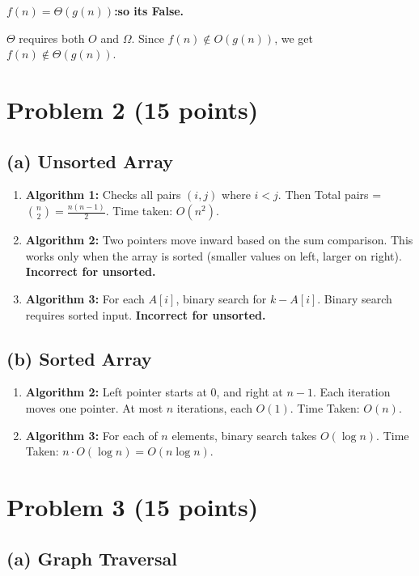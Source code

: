 \documentclass[11pt]{article}
\begin{document}
\textbf{$f(n)=\Theta(g(n))$:so its False.}

\medskip

$\Theta$ requires both $O$ and $\Omega$. Since $f(n) \notin O(g(n))$, we get $f(n) \notin \Theta(g(n))$.

\newpage
\section*{Problem 2 (15 points)}

\subsection*{(a) Unsorted Array}
\begin{enumerate}
    \item \textbf{Algorithm 1:} Checks all pairs $(i,j)$ where $i < j$. Then Total pairs = $\binom{n}{2} = \frac{n(n-1)}{2}$. Time taken: $O(n^2)$.
    \item \textbf{Algorithm 2:} Two pointers move inward based on the sum comparison. This  works only when the array is sorted (smaller values on left, larger on right). \textbf{Incorrect for unsorted.}
    \item \textbf{Algorithm 3:} For each $A[i]$, binary search for $k - A[i]$. Binary search requires sorted input. \textbf{Incorrect for unsorted.}
\end{enumerate}

\subsection*{(b) Sorted Array}
\begin{enumerate}
    \item \textbf{Algorithm 2:} Left pointer starts at 0, and right at $n-1$. Each iteration moves one pointer. At most $n$ iterations, each $O(1)$. Time Taken: $O(n)$.
    \item \textbf{Algorithm 3:} For each of $n$ elements, binary search takes $O(\log n)$. Time Taken: $n \cdot O(\log n) = O(n \log n)$.
\end{enumerate}

\newpage
\section*{Problem 3 (15 points)}

\subsection*{(a) Graph Traversal}
\end{document}
